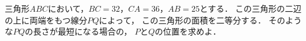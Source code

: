 \documentclass[../../main.tex]{subfiles}
\begin{document}
三角形$ABC$において，$BC=32$，$CA=36$，$AB=25$とする．
この三角形の二辺の上に両端をもつ線分$PQ$によって，
この三角形の面積を二等分する．
そのような$PQ$の長さが最短になる場合の，
$P$と$Q$の位置を求めよ．
\end{document}

